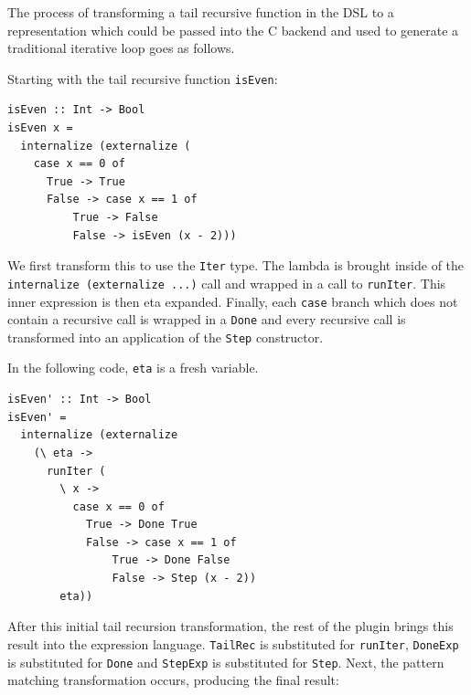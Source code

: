 \documentclass[runningheads, a4paper]{llncs}
\newcommand{\ttt}{\texttt}
\begin{document}
The process of transforming a tail recursive function in the DSL to a 
representation which could be passed into the C backend and used
to generate a traditional iterative loop goes as follows.

Starting with the tail recursive function  \ttt{isEven}:

\begin{lstlisting}
isEven :: Int -> Bool
isEven x =
  internalize (externalize (
    case x == 0 of
      True -> True
      False -> case x == 1 of
          True -> False
          False -> isEven (x - 2)))
\end{lstlisting}


We first transform this to use the \verb|Iter| type. The lambda is brought
inside of the \ttt{internalize (externalize ...)} call and wrapped in a call to
\ttt{runIter}. This inner expression is then eta expanded. Finally, each \verb|case|
branch which does not contain a recursive call is wrapped in a \verb|Done| and
every recursive call is transformed into an application of the \verb|Step| constructor.

In the following code, \verb|eta| is a fresh variable.

\begin{lstlisting}
isEven' :: Int -> Bool
isEven' =
  internalize (externalize
    (\ eta ->
      runIter (
        \ x ->
          case x == 0 of
            True -> Done True
            False -> case x == 1 of
                True -> Done False
                False -> Step (x - 2))
        eta))
\end{lstlisting}

After this initial tail recursion transformation, the rest of the plugin brings this
result into the expression language. \verb|TailRec| is substituted for \verb|runIter|,
\verb|DoneExp| is substituted for \verb|Done| and \verb|StepExp| is substituted for \verb|Step|.
Next, the pattern matching transformation occurs, producing the final result:

\end{document}
